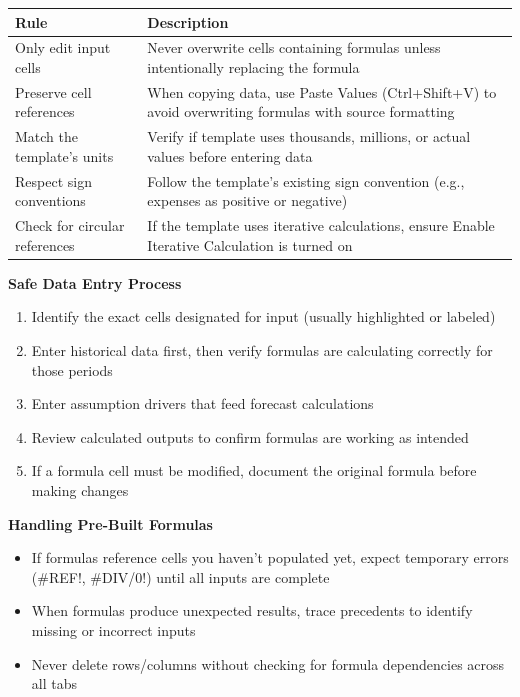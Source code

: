 \documentclass[11pt]{article}
\begin{document}
\begingroup
\small
\setlength{\tabcolsep}{2pt}
\begin{longtable}{>{\RaggedRight\arraybackslash\hspace{0pt}}p{}>{\RaggedRight\arraybackslash\hspace{0pt}}p{}}
\toprule
{} \textbf{Rule} & \textbf{Description} \\
\midrule
{} Only edit input cells & Never overwrite cells containing formulas unless intentionally replacing the formula \\
{} Preserve cell references & When copying data, use Paste Values (Ctrl+Shift+V) to avoid overwriting formulas with source formatting \\
{} Match the template's units & Verify if template uses thousands, millions, or actual values before entering data \\
{} Respect sign conventions & Follow the template's existing sign convention (e.g., expenses as positive or negative) \\
{} Check for circular references & If the template uses iterative calculations, ensure Enable Iterative Calculation is turned on \\
\bottomrule
\end{longtable}
\endgroup

\textbf{Safe Data Entry Process}

\begin{enumerate}[leftmargin=*,itemsep=2pt,topsep=2pt]
\item {} Identify the exact cells designated for input (usually highlighted or labeled)
\item {} Enter historical data first, then verify formulas are calculating correctly for those periods
\item {} Enter assumption drivers that feed forecast calculations
\item {} Review calculated outputs to confirm formulas are working as intended
\item {} If a formula cell must be modified, document the original formula before making changes
\end{enumerate}

\textbf{Handling Pre-Built Formulas}

\begin{itemize}[leftmargin=*,itemsep=2pt,topsep=2pt]
\item {} If formulas reference cells you haven't populated yet, expect temporary errors (\#REF!, \#DIV/0!) until all inputs are complete
\item {} When formulas produce unexpected results, trace precedents to identify missing or incorrect inputs
\item {} Never delete rows/columns without checking for formula dependencies across all tabs
\end{itemize}
\end{document}
